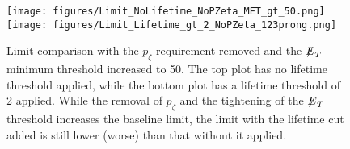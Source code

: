 \begin{figure}[tbh!]
\centering
\texttt{[image: figures/Limit\_NoLifetime\_NoPZeta\_MET\_gt\_50.png]}
\texttt{[image: figures/Limit\_Lifetime\_gt\_2\_NoPZeta\_123prong.png]}
\caption{Limit comparison with the $p_\zeta$ requirement removed and the ${\not\mathrel{E}}_T$ minimum threshold increased to 50. The top plot has no lifetime threshold applied, while the bottom plot has a lifetime threshold of 2 applied. While the removal of $p_\zeta$ and the tightening of the ${\not\mathrel{E}}_T$ threshold increases the baseline limit, the limit with the lifetime cut added is still lower (worse) than that without it applied.}
\label{fig:13TeVImprovedLimits}
\end{figure}
